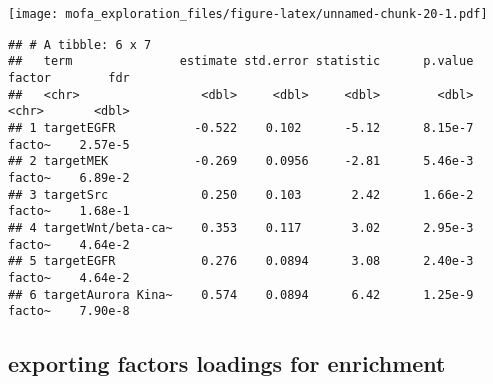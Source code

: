 \documentclass[
]{article}
\newenvironment{Shaded}{\begin{snugshade}}{\end{snugshade}}
\newcommand{\DataTypeTok}[1]{\textcolor[rgb]{0.13,0.29,0.53}{#1}}
\newcommand{\FloatTok}[1]{\textcolor[rgb]{0.00,0.00,0.81}{#1}}
\newcommand{\KeywordTok}[1]{\textcolor[rgb]{0.13,0.29,0.53}{\textbf{#1}}}
\newcommand{\NormalTok}[1]{#1}
\newcommand{\OperatorTok}[1]{\textcolor[rgb]{0.81,0.36,0.00}{\textbf{#1}}}
\newcommand{\StringTok}[1]{\textcolor[rgb]{0.31,0.60,0.02}{#1}}
\begin{document}
\texttt{[image: mofa\_exploration\_files/figure-latex/unnamed-chunk-20-1.pdf]}

\begin{Shaded}
\end{Shaded}

\begin{verbatim}
## # A tibble: 6 x 7
##   term               estimate std.error statistic      p.value factor        fdr
##   <chr>                 <dbl>     <dbl>     <dbl>        <dbl> <chr>       <dbl>
## 1 targetEGFR           -0.522    0.102      -5.12      8.15e-7 facto~    2.57e-5
## 2 targetMEK            -0.269    0.0956     -2.81      5.46e-3 facto~    6.89e-2
## 3 targetSrc             0.250    0.103       2.42      1.66e-2 facto~    1.68e-1
## 4 targetWnt/beta-ca~    0.353    0.117       3.02      2.95e-3 facto~    4.64e-2
## 5 targetEGFR            0.276    0.0894      3.08      2.40e-3 facto~    4.64e-2
## 6 targetAurora Kina~    0.574    0.0894      6.42      1.25e-9 facto~    7.90e-8
\end{verbatim}

\hypertarget{exporting-factors-loadings-for-enrichment}{%
\subsection{exporting factors loadings for
enrichment}\label{exporting-factors-loadings-for-enrichment}}
\end{document}
